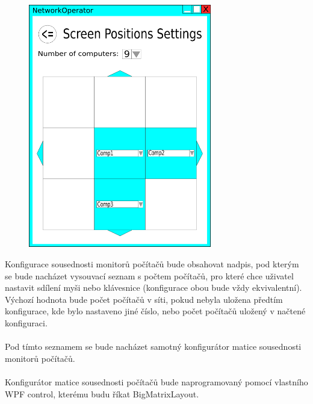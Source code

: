 \documentclass[12pt]{article}
\begin{document}
\begin{figure}[H]
\includegraphics[width=8cm]{gui7-screen-positions-settings-big-matrix.png}
\centering
\end{figure}

Konfigurace sousednosti monitorů počítačů bude obsahovat nadpis, pod kterým se bude nacházet vysouvací seznam s počtem počítačů, pro které chce uživatel nastavit sdílení myši nebo klávesnice (konfigurace obou bude vždy ekvivalentní). Výchozí hodnota bude počet počítačů v síti, pokud nebyla uložena předtím konfigurace, kde bylo nastaveno jiné číslo, nebo počet počítačů uložený v načtené konfiguraci.\\\\
Pod tímto seznamem se bude nacházet samotný konfigurátor matice sousednosti monitorů počítačů.\\\\
Konfigurátor matice sousednosti počítačů bude naprogramovaný pomocí vlastního WPF control, kterému budu říkat BigMatrixLayout.
\end{document}
